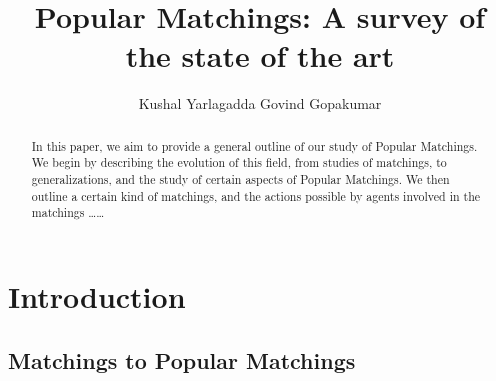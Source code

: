 \documentclass{llncs}
\begin{document}
\title{Popular Matchings: A survey of the state of the art}



\author{Kushal Yarlagadda  Govind Gopakumar}







\maketitle

\begin{abstract}
In this paper, we aim to provide a general outline of our study of Popular Matchings. We begin by describing the evolution of this field, from studies of matchings, to generalizations, and the study of certain aspects of Popular Matchings. We then outline a certain kind of matchings, and the actions possible by agents involved in the matchings \ldots\ldots
\end{abstract}

\section{Introduction}
\subsection{Matchings to Popular Matchings}
\end{document}
